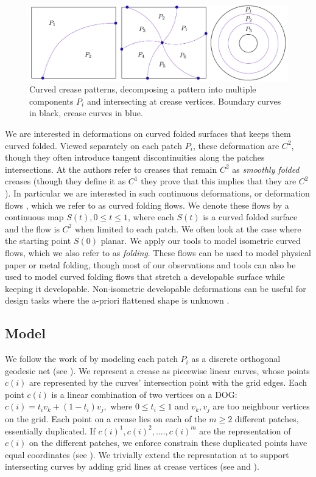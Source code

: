 \begin{figure} [h]
	\centering
	\includegraphics[width=\linewidth]{figures/crease_patterns}
	\caption{Curved crease patterns, decomposing a pattern into multiple components $P_i$ and intersecting at crease vertices. Boundary curves in black, crease curves in blue.}
	\label{fig:crease_pattern}
\end{figure}
We are interested in deformations on curved folded surfaces that keeps them curved folded. Viewed separately on each patch $P_i$, these deformation are $C^2$, though they often introduce tangent discontinuities along the patches intersections. At \cite{demaine_lens} the authors refer to creases that remain $C^2$ as \textit{smoothly folded} creases (though they define it as $C^1$ they prove that this implies that they are $C^2$). In particular we are interested in such continuous deformations, or deformation flows \cite{rabi2018shape}, which we refer to as curved folding flows. We denote these flows by a continuous map $S(t), 0 \leq t \leq 1$, where each $S(t)$ is a curved folded surface and the flow is $C^2$ when limited to each patch. We often look at the case where the starting point $S(0)$ planar. We apply our tools to model isometric curved flows, which we also refer to as \emph{folding}. These flows can be used to model physical paper or metal folding, though most of our observations and tools can also be used to model curved folding flows that stretch a developable surface while keeping it developable. Non-isometric developable deformations can be useful for design tasks where the a-priori flattened shape is unknown \cite{rabi18,rabi2018shape,pottmann_new} .

\subsection{Model} \label{sec:model}
We follow the work of \cite{rabi2018shape} by modeling each patch $P_i$ as a discrete orthogonal geodesic net (see ). We represent a crease as piecewise linear curves, whose points $c(i)$ are represented by the curves' intersection point with the grid edges. Each point $c(i)$ is a linear combination of two vertices on a DOG: $c(i) = t_i v_k + (1-t_i)v_j,$ where $0 \leq t_i \leq 1$ and $v_k,v_j$ are too neighbour vertices on the grid.  Each point on a crease lies on each of the $m \geq 2$ different patches, essentially duplicated. If $c(i)^1,c(i)^2,....,c(i)^m$ are the representation of $c(i)$ on the different patches, we enforce constrain these duplicated points have equal coordinates (see ).
We trivially extend the represntation at \cite{rabi2018shape} to support intersecting curves by adding grid lines at crease vertices (see  and ).

